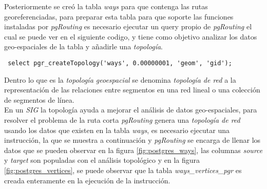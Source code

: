 

Posteriormente se creó la tabla \emph{ways} para que contenga las rutas georeferenciadas, para preparar esta tabla para que soporte las funciones instaladas por \emph{pgRouting} es necesario ejecutar un query propio de \emph{pgRouting} el cual se puede ver en el siguiente codigo, y tiene como objetivo analizar los datos geo-espaciales de la tabla y añadirle una \emph{topología}.\\


\begin{verbatim}
 select pgr_createTopology('ways', 0.00000001, 'geom', 'gid');
\end{verbatim}

Dentro lo que es la \emph{topología geoespacial} se denomina \emph{topología de red} a la representación de las relaciones entre segmentos en una red lineal o una colección de segmentos de línea. \cite{osgeo_journal_topology} \\

En un \emph{SIG} la topología ayuda a mejorar el análisis de datos geo-espaciales, para resolver el problema de la ruta corta \emph{pgRouting} genera una \emph{topología de red} usando los datos que existen en la tabla \emph{ways}, es necesario ejecutar una instrucción, la que se muestra a continuación y \emph{pgRouting} se encarga de llenar los datos que se pueden observar en la figura \ref{fig:postgres_ways}, las columnas \emph{source} y \emph{target} son populadas con el análisis topológico y en la figura \ref{fig:postgres_vertices}, se puede observar que la tabla \emph{ways\_vertices\_pgr} es creada enteramente en la ejecución de la instrucción.\\

